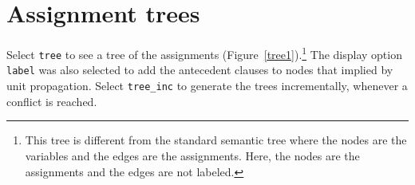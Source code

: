 \documentclass[11pt]{report}
\newcommand*{\p}[1]{\textup{\texttt{#1}}}
\begin{document}
\begin{itemize}
\end{itemize}

\newpage

\section{Assignment trees}

Select \p{tree} to see a tree of the assignments
(Figure~\ref{tree1}).\footnote{This tree is different from the standard
semantic tree where the nodes are the variables and the edges are the
assignments. Here, the nodes are the assignments and the edges are not
labeled.} The display option \p{label} was also selected to add the
antecedent clauses to nodes that implied by unit propagation. Select
\p{tree\_inc} to generate the trees incrementally, whenever a conflict
is reached.
\end{document}
